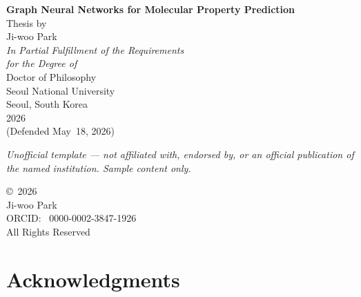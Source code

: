 \documentclass[11pt,twoside,openright]{book}
\begin{document}
\begin{titlepage}
\thispagestyle{empty}
\begin{center}

\vspace*{0.15\textheight}

{\Huge\bfseries Graph Neural Networks for Molecular Property Prediction}\\[36pt]

{\LARGE Thesis by}\\[18pt]

{\LARGE Ji-woo Park}\\[48pt]

{\large\textit{In Partial Fulfillment of the Requirements\\[4pt]
for the Degree of}}\\[18pt]

{\LARGE Doctor of Philosophy}\\[48pt]

{\large Seoul National University}\\[6pt]
{\large Seoul, South Korea}\\[30pt]

{\large 2026}\\[18pt]

{\normalsize\color{MidGray}(Defended May~18, 2026)}

\vfill
{\footnotesize\itshape Unofficial template --- not affiliated with, endorsed by, or an official publication of the named institution. Sample content only.}
\end{center}
\end{titlepage}

\cleardoublepage
\thispagestyle{empty}
\vspace*{0.4\textheight}

\begin{center}
{\large\copyright\ 2026}\\[12pt]
{\large Ji-woo Park}\\[12pt]
{\normalsize ORCID: \faOrcid\ 0000-0002-3847-1926}\\[24pt]
{\normalsize All Rights Reserved}
\end{center}

\cleardoublepage
\chapter*{Acknowledgments}
\end{document}
